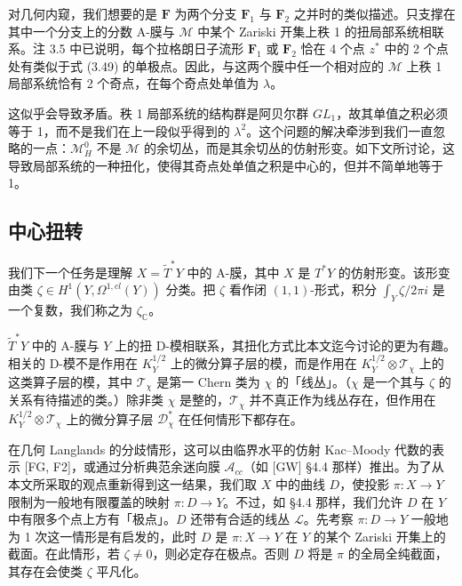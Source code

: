 对几何内窥，我们想要的是 $\boldsymbol{F}$ 为两个分支 $\boldsymbol{F}_1$ 与 $\boldsymbol{F}_2$ 之并时的类似描述。只支撑在其中一个分支上的分数 A-膜与 $\mathcal{M}$ 中某个 Zariski 开集上秩 1 的扭局部系统相联系。注 3.5 中已说明，每个拉格朗日子流形 $\boldsymbol{F}_1$ 或 $\boldsymbol{F}_2$ 恰在 4 个点 $z^*$ 中的 2 个点处有类似于式 (3.49) 的单极点。因此，与这两个膜中任一个相对应的 $\mathcal{M}$ 上秩 1 局部系统恰有 2 个奇点，在每个奇点处单值为 $\lambda$。

这似乎会导致矛盾。秩 1 局部系统的结构群是阿贝尔群 $GL_1$，故其单值之积必须等于 1，而不是我们在上一段似乎得到的 $\lambda^2$。这个问题的解决牵涉到我们一直忽略的一点：$\mathcal{M}_H^0$ 不是 $\mathcal{M}$ 的余切丛，而是其余切丛的仿射形变。如下文所讨论，这导致局部系统的一种扭化，使得其奇点处单值之积是中心的，但并不简单地等于 1。


\subsection{中心扭转}

我们下一个任务是理解 $X=\widetilde{T}^*Y$ 中的 A-膜，其中 $X$ 是 $T^*Y$ 的仿射形变。该形变由类 $\zeta\in H^1(Y,\Omega^{1,cl}(Y))$ 分类。把 $\zeta$ 看作闭 $(1,1)$-形式，积分 $\int_Y\zeta/2\pi i$ 是一个复数，我们称之为 $\zeta_{\mathbb{C}}$。

$\widetilde{T}^*Y$ 中的 A-膜与 $Y$ 上的扭 D-模相联系，其扭化方式比本文迄今讨论的更为有趣。相关的 D-模不是作用在 $K_Y^{1/2}$ 上的微分算子层的模，而是作用在 $K_Y^{1/2}\otimes\mathcal{T}_\chi$ 上的这类算子层的模，其中 $\mathcal{T}_\chi$ 是第一 Chern 类为 $\chi$ 的「线丛」。（$\chi$ 是一个其与 $\zeta$ 的关系有待描述的类。）除非类 $\chi$ 是整的，$\mathcal{T}_\chi$ 并不真正作为线丛存在，但作用在 $K_Y^{1/2}\otimes\mathcal{T}_\chi$ 上的微分算子层 $\mathcal{D}_\chi^*$ 在任何情形下都存在。

在几何 Langlands 的分歧情形，这可以由临界水平的仿射 Kac--Moody 代数的表示 [FG, F2]，或通过分析典范余迷向膜 $\mathcal{A}_{cc}$（如 [GW] §4.4 那样）推出。为了从本文所采取的观点重新得到这一结果，我们取 $X$ 中的曲线 $D$，使投影 $\pi:X\to Y$ 限制为一般地有限覆盖的映射 $\pi:D\to Y$。不过，如 §4.4 那样，我们允许 $D$ 在 $Y$ 中有限多个点上方有「极点」。$D$ 还带有合适的线丛 $\mathcal{L}$。先考察 $\pi:D\to Y$ 一般地为 1 次这一情形是有启发的，此时 $D$ 是 $\pi:X\to Y$ 在 $Y$ 的某个 Zariski 开集上的截面。在此情形，若 $\zeta\neq0$，则必定存在极点。否则 $D$ 将是 $\pi$ 的全局全纯截面，其存在会使类 $\zeta$ 平凡化。

